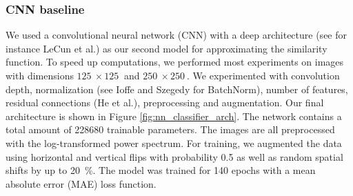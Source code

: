 \documentclass[10pt,conference,compsocconf]{IEEEtran}
\begin{document}
\subsubsection{CNN baseline} %
We used a convolutional neural network (CNN) with a deep architecture (see for instance LeCun et al.\@ \cite{DeepLearning}) as our second model for approximating the similarity function. To speed up computations, we performed most experiments on images with dimensions $\SI{125}{}\times\SI{125}{}$ and $\SI{250}{}\times\SI{250}{}$. We experimented with convolution depth, normalization (see Ioffe and Szegedy \cite{BatchNorm} for BatchNorm), number of features, residual connections (He et al.\@ \cite{ResNet}), preprocessing and augmentation.
Our final architecture is shown in Figure \ref{fig:nn_classifier_arch}. The network contains a total amount of \SI{228680}{} trainable parameters. The images are all preprocessed with the log-transformed power spectrum. For training, we augmented the data using horizontal and vertical flips with probability \SI{0.5}{} as well as random spatial shifts by up to \SI{20}{\percent}. The model was trained for \SI{140}{} epochs with a mean absolute error (MAE) loss function. %
\end{document}
